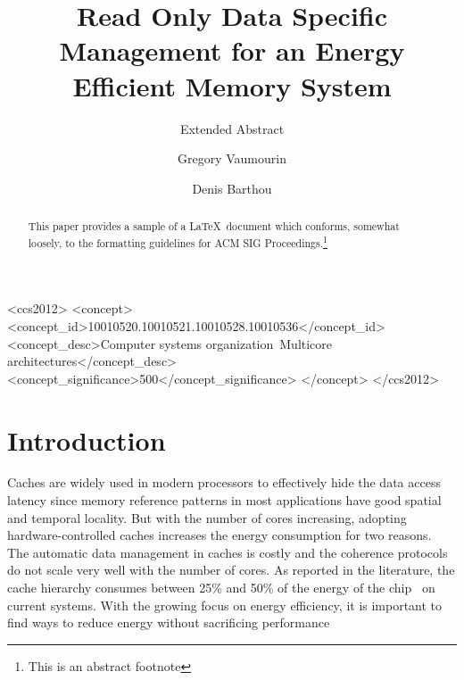 \documentclass[sigconf]{acmart}
\begin{document}
\title{Read Only Data Specific Management for an Energy Efficient Memory System}
\subtitle{Extended Abstract}


\author{Gregory Vaumourin}

\author{Denis Barthou}


\begin{abstract}
This paper provides a sample of a \LaTeX\ document which conforms,
somewhat loosely, to the formatting guidelines for
ACM SIG Proceedings.\footnote{This is an abstract footnote}
\end{abstract}

%
%

 \begin{CCSXML}
<ccs2012>
<concept>
<concept_id>10010520.10010521.10010528.10010536</concept_id>
<concept_desc>Computer systems organization~Multicore architectures</concept_desc>
<concept_significance>500</concept_significance>
</concept>
</ccs2012>
\end{CCSXML}




\maketitle

\section{Introduction}

Caches are widely used in modern processors to effectively hide the data access latency since memory reference patterns in most applications have good spatial and temporal locality. But with the number of cores increasing, adopting hardware-controlled caches increases the energy consumption for two reasons. The automatic data management in caches is costly and the coherence protocols do not scale very well with the number of cores. As reported in the literature, the cache hierarchy consumes between 25\% and 50\% of the energy of the chip~\cite{Segars:2001} on current systems. With the growing focus on energy efficiency, it is important to find ways to reduce energy without sacrificing performance
\end{document}
